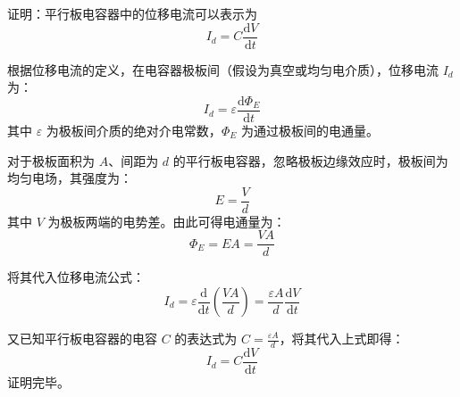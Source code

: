 \begin{exercise}\label{ex:20.1}
证明：平行板电容器中的位移电流可以表示为
$$ I_d = C \frac{\mathrm{d}V}{\mathrm{d}t} $$
\end{exercise}
\begin{solution}
根据位移电流的定义，在电容器极板间（假设为真空或均匀电介质），位移电流 $I_d$ 为：
$$ I_d = \varepsilon \frac{\mathrm{d}\Phi_E}{\mathrm{d}t} $$
其中 $\varepsilon$ 为极板间介质的绝对介电常数，$\Phi_E$ 为通过极板间的电通量。

对于极板面积为 $A$、间距为 $d$ 的平行板电容器，忽略极板边缘效应时，极板间为均匀电场，其强度为：
$$ E = \frac{V}{d} $$
其中 $V$ 为极板两端的电势差。由此可得电通量为：
$$ \Phi_E = E A = \frac{V A}{d} $$

将其代入位移电流公式：
$$ I_d = \varepsilon \frac{\mathrm{d}}{\mathrm{d}t} \left( \frac{V A}{d} \right) = \frac{\varepsilon A}{d} \frac{\mathrm{d}V}{\mathrm{d}t} $$

又已知平行板电容器的电容 $C$ 的表达式为 $C = \frac{\varepsilon A}{d}$，将其代入上式即得：
$$ I_d = C \frac{\mathrm{d}V}{\mathrm{d}t} $$
证明完毕。
\end{solution}

